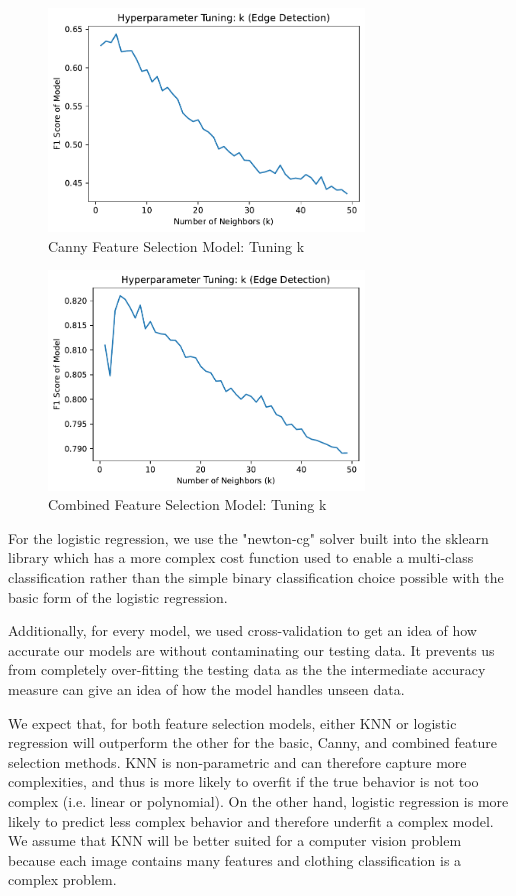 \begin{figure}[!h]
    \centering
    \includegraphics[width=3.3in]{tuning_k_canny.pdf}
    \caption{Canny Feature Selection Model: Tuning k}
    \label{fig:my_label}
\end{figure}

\begin{figure}[!h]
    \centering
    \includegraphics[width=3.3in]{tuning_k_combine.pdf}
    \caption{Combined Feature Selection Model: Tuning k}
    \label{fig:my_label}
\end{figure}

For the logistic regression, we use the "newton-cg" solver built into the sklearn library which has a more complex cost function used to enable a multi-class classification rather than the simple binary classification choice possible with the basic form of the logistic regression.

Additionally, for every model, we used cross-validation to get an idea of how accurate our models are without contaminating our testing data. It prevents us from completely over-fitting the testing data as the the intermediate accuracy measure can give an idea of how the model handles unseen data.

We expect that, for both feature selection models, either KNN or logistic regression will outperform the other for the basic, Canny, and combined feature selection methods. KNN is non-parametric and can therefore capture more complexities, and thus is more likely to overfit if the true behavior is not too complex (i.e. linear or polynomial). On the other hand, logistic regression is more likely to predict less complex behavior and therefore underfit a complex model. We assume that KNN will be better suited for a computer vision problem because each image contains many features and clothing classification is a complex problem.